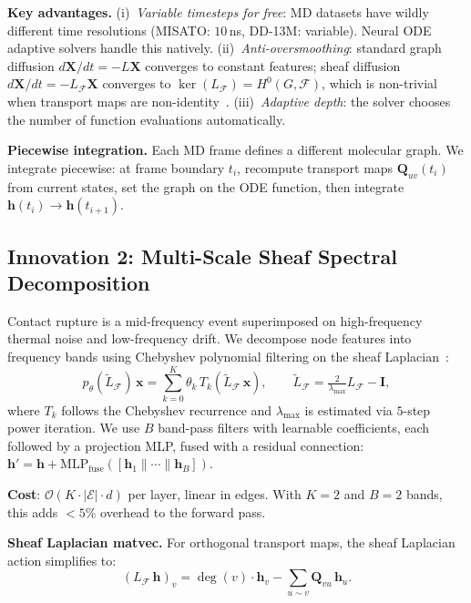 \documentclass{article}
\begin{document}
\textbf{Key advantages.}
(i)~\emph{Variable timesteps for free}: MD datasets have wildly
different time resolutions (MISATO: $10\,$ns, DD-13M: variable).
Neural ODE adaptive solvers handle this natively.
(ii)~\emph{Anti-oversmoothing}: standard graph diffusion
$d\mathbf{X}/dt = -L\mathbf{X}$ converges to constant features;
sheaf diffusion $d\mathbf{X}/dt = -L_\mathcal{F}\mathbf{X}$ converges
to $\ker(L_\mathcal{F}) = H^0(G,\mathcal{F})$, which is non-trivial
when transport maps are non-identity~\citep{bodnar2022neural}.
(iii)~\emph{Adaptive depth}: the solver chooses the number of function
evaluations automatically.

\textbf{Piecewise integration.}
Each MD frame defines a different molecular graph.  We integrate
piecewise: at frame boundary $t_i$, recompute transport maps
$\mathbf{Q}_{uv}(t_i)$ from current states, set the graph on the ODE
function, then integrate $\mathbf{h}(t_i) \to \mathbf{h}(t_{i+1})$.

\subsection{Innovation 2: Multi-Scale Sheaf Spectral Decomposition}
\label{sec:spectral}

Contact rupture is a mid-frequency event superimposed on high-frequency
thermal noise and low-frequency drift.  We decompose node features into
frequency bands using Chebyshev polynomial filtering on the sheaf
Laplacian~\citep{defferrard2016convolutional,li2025polynsd}:
\begin{equation}
  p_\theta(\tilde{L}_\mathcal{F})\,\mathbf{x}
  = \sum_{k=0}^{K} \theta_k\, T_k(\tilde{L}_\mathcal{F}\,\mathbf{x}),
  \qquad
  \tilde{L}_\mathcal{F}
  = \tfrac{2}{\lambda_\text{max}} L_\mathcal{F} - \mathbf{I},
  \label{eq:chebyshev}
\end{equation}
where $T_k$ follows the Chebyshev recurrence and $\lambda_\text{max}$
is estimated via $5$-step power iteration.  We use $B$ band-pass
filters with learnable coefficients, each followed by a projection
MLP, fused with a residual connection:
$\mathbf{h}' = \mathbf{h} +
\text{MLP}_\text{fuse}([\mathbf{h}_1 \| \cdots \| \mathbf{h}_B])$.

\textbf{Cost}: $\mathcal{O}(K \cdot |\mathcal{E}| \cdot d)$ per layer,
linear in edges.  With $K{=}2$ and $B{=}2$ bands, this adds $<5\%$
overhead to the forward pass.

\textbf{Sheaf Laplacian matvec.}
For orthogonal transport maps, the sheaf Laplacian action simplifies to:
\begin{equation}
  (L_\mathcal{F}\,\mathbf{h})_v
  = \deg(v) \cdot \mathbf{h}_v
  - \sum_{u \sim v} \mathbf{Q}_{vu}\,\mathbf{h}_u.
  \label{eq:laplacian}
\end{equation}
\end{document}
